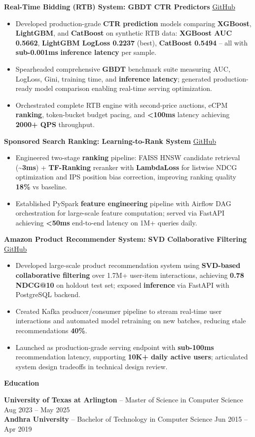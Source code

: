 \documentclass[10pt, letterpaper]{article}
\newcommand{\mysection}[1]{%
  \vspace{10pt}%
  {\noindent\large\bfseries #1}%
  \vspace{4pt}{\hrule}%
  \vspace{6pt}%
}
\newcommand{\resumeItem}[1]{\item\small{#1}}
\begin{document}
\noindent\textbf{Real-Time Bidding (RTB) System: GBDT CTR Predictors} \hfill \href{https://github.com/saitejasrivilli/rtb-bidding-system}{GitHub}
\begin{itemize}
  \resumeItem{Developed production-grade \textbf{CTR prediction} models comparing \textbf{XGBoost}, \textbf{LightGBM}, and \textbf{CatBoost} on synthetic RTB data: \textbf{XGBoost AUC 0.5662}, \textbf{LightGBM LogLoss 0.2237} (best), \textbf{CatBoost 0.5494} -- all with \textbf{sub-0.001ms} \textbf{inference latency} per sample.}
  \resumeItem{Spearheaded comprehensive \textbf{GBDT} benchmark suite measuring AUC, LogLoss, Gini, training time, and \textbf{inference latency}; generated production-ready model comparison enabling real-time serving optimization.}
  \resumeItem{Orchestrated complete RTB engine with second-price auctions, eCPM \textbf{ranking}, token-bucket budget pacing, and \textbf{\textless{}100ms} latency achieving \textbf{2000+ QPS} throughput.}
\end{itemize}

\noindent\textbf{Sponsored Search Ranking: Learning-to-Rank System} \hfill \href{https://github.com/saitejasrivilli/sponsored-search-ranking}{GitHub}
\begin{itemize}
  \resumeItem{Engineered two-stage \textbf{ranking} pipeline: FAISS HNSW candidate retrieval (\textbf{\textasciitilde 3ms}) + \textbf{TF-Ranking} reranker with \textbf{LambdaLoss} for listwise NDCG optimization and IPS position bias correction, improving ranking quality \textbf{18\%} vs baseline.}
  \resumeItem{Established PySpark \textbf{feature engineering} pipeline with Airflow DAG orchestration for large-scale feature computation; served via FastAPI achieving \textbf{\textless{}50ms} end-to-end latency on 1M+ queries daily.}
\end{itemize}

\noindent\textbf{Amazon Product Recommender System: SVD Collaborative Filtering} \hfill \href{https://github.com/saitejasrivilli/amazon-product-recommender}{GitHub}
\begin{itemize}
  \resumeItem{Developed large-scale product recommendation system using \textbf{SVD-based collaborative filtering} over 1.7M+ user-item interactions, achieving \textbf{0.78 NDCG@10} on holdout test set; exposed \textbf{inference} via FastAPI with PostgreSQL backend.}
  \resumeItem{Created Kafka producer/consumer pipeline to stream real-time user interactions and automated model retraining on new batches, reducing stale recommendations \textbf{40\%}.}
  \resumeItem{Launched as production-grade serving endpoint with \textbf{sub-100ms} recommendation latency, supporting \textbf{10K+ daily active users}; articulated system design tradeoffs in technical design review.}
\end{itemize}
\vspace{-3mm}
\mysection{Education}
\noindent\textbf{University of Texas at Arlington} -- Master of Science in Computer Science \hfill Aug 2023 -- May 2025 \\
\noindent\textbf{Andhra University} -- Bachelor of Technology in Computer Science \hfill Jun 2015 -- Apr 2019
\end{document}
